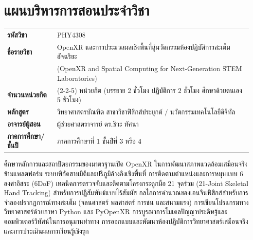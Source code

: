 \chapter*{แผนบริหารการสอนประจำวิชา}

\begin{tcolorbox}[enhanced, colback=white, colframe=darkNavy, colbacktitle=darkNavy,
    coltitle=white, fonttitle=\bfseries\normalsize,
    title={ข้อมูลทั่วไปของรายวิชา},
    arc=2mm, boxrule=0.8pt, leftrule=4mm,
    top=8pt, bottom=8pt, left=10pt, right=10pt]
\begin{tabularx}{\textwidth}{l>{\raggedright\arraybackslash}X}
\textbf{รหัสวิชา} & PHY4308 \\
\textbf{ชื่อรายวิชา} & OpenXR และการประมวลผลเชิงพื้นที่สู่นวัตกรรมห้องปฏิบัติการสะเต็มอัจฉริยะ \\
 & (OpenXR and Spatial Computing for Next-Generation STEM Laboratories) \\
\textbf{จำนวนหน่วยกิต} & 3(2-2-5) หน่วยกิต (บรรยาย 2 ชั่วโมง ปฏิบัติการ 2 ชั่วโมง ศึกษาด้วยตนเอง 5 ชั่วโมง) \\
\textbf{หลักสูตร} & วิทยาศาสตรบัณฑิต สาขาวิชาฟิสิกส์ประยุกต์ / นวัตกรรมเทคโนโลยีดิจิทัล \\
\textbf{อาจารย์ผู้สอน} & ผู้ช่วยศาสตราจารย์ ดร.ชีวะ ทัศนา \\
\textbf{ภาคการศึกษา/ชั้นปี} & ภาคการศึกษาที่ 1 ชั้นปีที่ 3 หรือ 4 \\
\end{tabularx}
\end{tcolorbox}

\begin{tcolorbox}[enhanced, colback=openxrSoftBg, colframe=openxrTeal, colbacktitle=openxrTeal,
    coltitle=white, fonttitle=\bfseries\normalsize,
    title={คำอธิบายรายวิชา (Course Description)},
    arc=2mm, boxrule=0.8pt, leftrule=4mm,
    top=8pt, bottom=8pt, left=10pt, right=10pt, before skip=8pt]
ศึกษาหลักการและสถาปัตยกรรมของมาตรฐานเปิด OpenXR ในการพัฒนาสภาพแวดล้อมเสมือนจริงข้ามแพลตฟอร์ม ระบบพิกัดสามมิติและปริภูมิอ้างอิงเชิงพื้นที่ การติดตามตำแหน่งและการหมุนแบบ 6 องศาอิสระ (6DoF) เทคนิคการตรวจจับและติดตามโครงกระดูกมือ 21 จุดร่วม (21-Joint Skeletal Hand Tracking) สำหรับการปฏิสัมพันธ์แบบไร้สัมผัส กลไกการคำนวณของเอนจินฟิสิกส์สำหรับการจำลองปรากฏการณ์ทางสะเต็ม (จลนศาสตร์ พลศาสตร์ การชน และสนามแรง) การเขียนโปรแกรมทางวิทยาศาสตร์ด้วยภาษา Python และ PyOpenXR การบูรณาการโมเดลปัญญาประดิษฐ์และคอมพิวเตอร์วิทัศน์ในการอนุมานท่าทาง การออกแบบและพัฒนาห้องปฏิบัติการวิทยาศาสตร์เสมือนจริง และการประเมินผลการเรียนรู้เชิงรุก
\end{tcolorbox}

